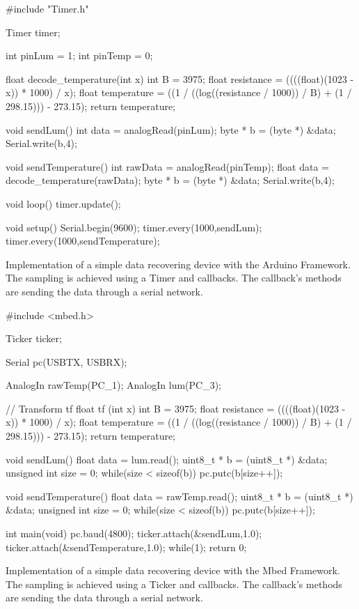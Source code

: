 \begin{listing}[H]
  \centering
\begin{scalacode}
#include "Timer.h"

Timer timer;

int pinLum = 1;
int pinTemp = 0;

float decode_temperature(int x){
  int B = 3975;
  float resistance = ((((float)(1023 - x)) * 1000) / x);
  float temperature = ((1 / ((log((resistance / 1000)) / B) + (1 / 298.15))) - 273.15);
  return temperature;
}

void sendLum(){
  int data = analogRead(pinLum);
  byte * b = (byte *) &data;
  Serial.write(b,4);
}

void sendTemperature(){
  int rawData = analogRead(pinTemp);
  float data = decode_temperature(rawData);
  byte * b = (byte *) &data;
  Serial.write(b,4);
}

void loop() {
  timer.update();
}

void setup() {
  Serial.begin(9600);
  timer.every(1000,sendLum);
  timer.every(1000,sendTemperature);
}
\end{scalacode}
  \caption[Arduino code for a simple data recovering]{Implementation of a simple
data recovering device with the Arduino Framework. The sampling is achieved
using a Timer and callbacks. The callback’s methods are sending the data through a
serial network.}
  \label{lst:arduino_generalisation}
\end{listing}

\begin{listing}[H]
  \centering
\begin{scalacode}
#include <mbed.h>

Ticker ticker;

Serial pc(USBTX, USBRX);

AnalogIn rawTemp(PC_1);
AnalogIn lum(PC_3);

 // Transform tf
float tf (int x){
  int B = 3975;
  float resistance = ((((float)(1023 - x)) * 1000) / x);
  float temperature = ((1 / ((log((resistance / 1000)) / B) + (1 / 298.15))) - 273.15);
  return temperature;
}

void sendLum(){
  float data = lum.read();
  uint8_t * b = (uint8_t *) &data;
  unsigned int size = 0;
  while(size < sizeof(b)) {
      pc.putc(b[size++]);
  }
}

void sendTemperature(){
  float data = rawTemp.read();
  uint8_t * b = (uint8_t *) &data;
  unsigned int size = 0;
  while(size < sizeof(b)) {
    pc.putc(b[size++]);
  }
}

int main(void) {
  pc.baud(4800);
  ticker.attach(&sendLum,1.0);
  ticker.attach(&sendTemperature,1.0);
  while(1);
  return 0;
}
\end{scalacode}
  \caption[Mbed code for a simple data recovering]{Implementation of a simple
data recovering device with the Mbed Framework. The sampling is achieved
using a Ticker and callbacks. The callback’s methods are sending the data through a
serial network.}
  \label{lst:mbed_generalisation}
\end{listing}

